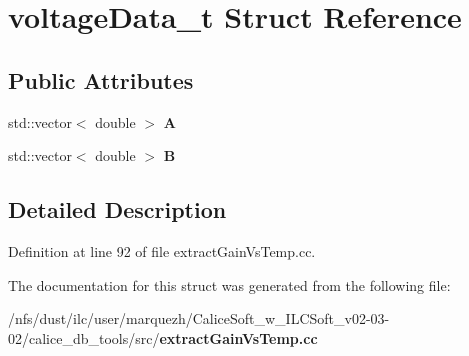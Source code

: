 \section{voltage\-Data\-\_\-t Struct Reference}
\label{structvoltageData__t}
\subsection*{Public Attributes}
\begin{DoxyCompactItemize}
\item 
std\-::vector$<$ double $>$ {\bfseries A}\label{structvoltageData__t_a56e10365b70d9e59f142cb9084621bed}

\item 
std\-::vector$<$ double $>$ {\bfseries B}\label{structvoltageData__t_a44e974fb0b6035c3000d0a59abaca721}

\end{DoxyCompactItemize}


\subsection{Detailed Description}


Definition at line 92 of file extract\-Gain\-Vs\-Temp.\-cc.



The documentation for this struct was generated from the following file\-:\begin{DoxyCompactItemize}
\item 
/nfs/dust/ilc/user/marquezh/\-Calice\-Soft\-\_\-w\-\_\-\-I\-L\-C\-Soft\-\_\-v02-\/03-\/02/calice\-\_\-db\-\_\-tools/src/{\bf extract\-Gain\-Vs\-Temp.\-cc}\end{DoxyCompactItemize}
